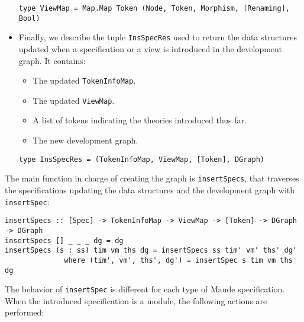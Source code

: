 \begin{itemize}
{\codesize
\begin{verbatim}
type ViewMap = Map.Map Token (Node, Token, Morphism, [Renaming], Bool)
\end{verbatim}
}

\item Finally, we describe the tuple \verb"InsSpecRes"
used to return the data structures
updated when a specification or a view is introduced in the development
graph. It contains:

\begin{itemize}
\item The updated \verb"TokenInfoMap".
\item The updated \verb"ViewMap".
\item A list of tokens indicating the theories introduced thus far.
\item The new development graph.
\end{itemize}

{\codesize
\begin{verbatim}
type InsSpecRes = (TokenInfoMap, ViewMap, [Token], DGraph)
\end{verbatim}
}

\end{itemize}

The main function in charge of creating the graph is
\verb"insertSpecs", that traverses the specifications updating the
data structures and the development graph with \verb"insertSpec":

{\codesize
\begin{verbatim}
insertSpecs :: [Spec] -> TokenInfoMap -> ViewMap -> [Token] -> DGraph -> DGraph
insertSpecs [] _ _ _ dg = dg
insertSpecs (s : ss) tim vm ths dg = insertSpecs ss tim' vm' ths' dg'
              where (tim', vm', ths', dg') = insertSpec s tim vm ths dg
\end{verbatim}
}

The behavior of \verb"insertSpec" is different for each type of Maude
specification. When the introduced specification is a module, the
following actions are performed:

